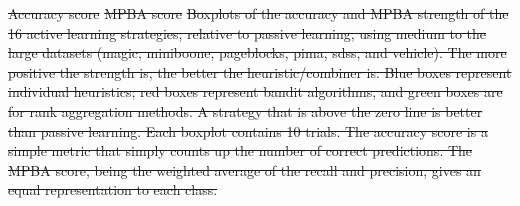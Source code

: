 \documentclass[fleqn,10pt,lineno]{wlpeerj} %
\providecommand{\DIFdeltex}[1]{{\protect\color{red}\sout{#1}}}                      %
\providecommand{\DIFdelFL}[1]{\DIFdel{#1}} %
\providecommand{\DIFdel}[1]{\texorpdfstring{\DIFdeltex{#1}}{}} %
\begin{document}
{%
\DIFdelFL{Accuracy score}}
{%
\DIFdelFL{MPBA score}}
{%
\DIFdelFL{Boxplots of the accuracy and MPBA strength of the
	16 active learning strategies, relative to passive learning, using medium
	to the large datasets (magic, miniboone, pageblocks, pima, sdss, and
	vehicle). The more positive the strength is, the better the
	heuristic/combiner is. Blue boxes represent individual heuristics; red
	boxes represent bandit algorithms, and green boxes are for rank aggregation
	methods. A strategy that is above the zero line is better than passive
	learning. Each boxplot contains 10 trials. The accuracy score is a simple
	metric that simply counts up the number of correct predictions. The MPBA
	score, being the weighted average of the recall and precision, gives an
	equal representation to each class.}}
\end{document}
